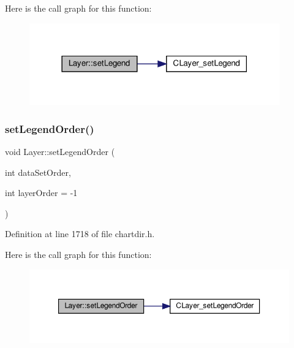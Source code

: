 Here is the call graph for this function\+:
\nopagebreak
\begin{figure}[H]
\begin{center}
\leavevmode
\includegraphics[width=306pt]{class_layer_a9e9f2fc29249b58cf56048c7c2861de7_cgraph}
\end{center}
\end{figure}
\mbox{\label{class_layer_a8cfa48350575091c07874b5a716a46a2}} 
\subsubsection{\texorpdfstring{set\+Legend\+Order()}{setLegendOrder()}}
{\footnotesize\ttfamily void Layer\+::set\+Legend\+Order (\begin{DoxyParamCaption}\item[{int}]{data\+Set\+Order,  }\item[{int}]{layer\+Order = {\ttfamily -\/1} }\end{DoxyParamCaption})\hspace{0.3cm}{\ttfamily [inline]}}



Definition at line 1718 of file chartdir.\+h.

Here is the call graph for this function\+:
\nopagebreak
\begin{figure}[H]
\begin{center}
\leavevmode
\includegraphics[width=350pt]{class_layer_a8cfa48350575091c07874b5a716a46a2_cgraph}
\end{center}
\end{figure}
\mbox{\label{class_layer_aab577b53410b150fc84dbb5dd502ff5f}} 
